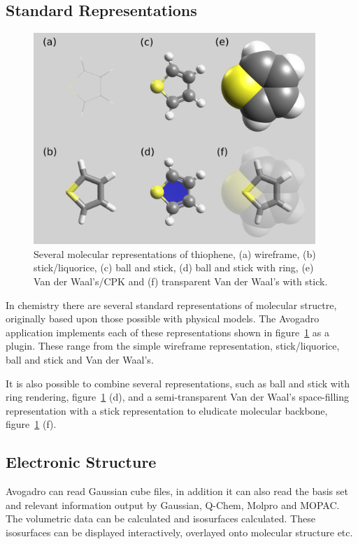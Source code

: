 \documentclass{article}
\begin{document}
\subsection{Standard Representations}

\begin{figure}
	\includegraphics[width=0.95\textwidth]{images/standardRepsLabel}
	\caption{Several molecular representations of thiophene, (a) wireframe, (b) stick/liquorice, (c) ball and stick, (d) ball and stick with ring, (e) Van der Waal's/CPK and (f) transparent Van der Waal's with stick.}
	\label{f:standardReps}
\end{figure}

In chemistry there are several standard representations of molecular structre, originally based upon those possible with physical models. The Avogadro application implements each of these representations shown in figure~\ref{f:standardReps} as a plugin. These range from the simple wireframe representation, stick/liquorice, ball and stick and Van der Waal's.

It is also possible to combine several representations, such as ball and stick with ring rendering, figure~\ref{f:standardReps} (d), and a semi-transparent Van der Waal's space-filling representation with a stick representation to eludicate molecular backbone, figure~\ref{f:standardReps} (f).

\subsection{Electronic Structure}

Avogadro can read Gaussian cube files, in addition it can also read the basis set and relevant information output by Gaussian, Q-Chem, Molpro and MOPAC. The volumetric data can be calculated and isosurfaces calculated. These isosurfaces can be displayed interactively, overlayed onto molecular structure etc.
\end{document}
